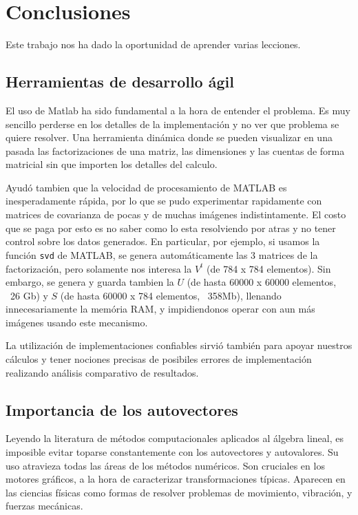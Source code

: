 \section{Conclusiones}

Este trabajo nos ha dado la oportunidad de aprender varias lecciones.

\subsection{Herramientas de desarrollo \'agil}

El uso de Matlab ha sido fundamental a la hora de entender el problema.
Es muy sencillo perderse en los detalles de la implementaci\'on y no ver que
problema se quiere resolver. Una herramienta din\'amica donde se pueden visualizar
en una pasada las factorizaciones de una matriz, las dimensiones y las cuentas
de forma matricial sin que importen los detalles del calculo.

Ayud\'o tambien que la velocidad de procesamiento de MATLAB es inesperadamente
r\'apida, por lo que se pudo experimentar rapidamente con matrices de covarianza
de pocas y de muchas im\'agenes indistintamente. El costo que se paga por esto es
no saber como lo esta resolviendo por atras y no tener control sobre los datos generados.
En particular, por ejemplo, si usamos la funci\'on \texttt{svd} de MATLAB, se genera
autom\'aticamente las 3 matrices de la factorizaci\'on, pero solamente nos interesa
la $V^t$ (de 784 x 784 elementos). Sin embargo, se genera y guarda tambien la $U$ (de hasta
60000 x 60000 elementos, ~26 Gb) y $S$ (de hasta 60000 x 784 elementos, ~358Mb), llenando innecesariamente
la mem\'oria RAM, y impidiendonos operar con aun m\'as im\'agenes usando este mecanismo.

La utilizaci\'on de implementaciones confiables sirvi\'o tambi\'en para apoyar nuestros
c\'alculos y tener nociones precisas de posibiles errores de implementaci\'on
realizando an\'alisis comparativo de resultados.

\subsection{Importancia de los autovectores}

Leyendo la literatura de m\'etodos computacionales aplicados al \'algebra lineal, es
imposible evitar toparse constantemente con los autovectores y autovalores. Su
uso atravieza todas las \'areas de los m\'etodos num\'ericos. Son cruciales
en los motores gr\'aficos, a la hora de caracterizar transformaciones t\'ipicas.
Aparecen en las ciencias f\'isicas como formas de resolver problemas de movimiento,
vibraci\'on, y fuerzas mec\'anicas.

